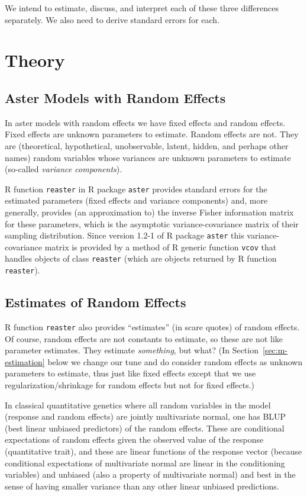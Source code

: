 \documentclass[11pt]{article}
\let\code=\texttt
\begin{document}
We intend to estimate, discuss, and interpret each of these three differences
separately.  We also need to derive standard errors for each.

\section{Theory}

\subsection{Aster Models with Random Effects}

In aster models with random effects \citep{reaster} we have fixed effects
and random effects.  Fixed effects are unknown parameters to estimate.
Random effects are not.  They are (theoretical, hypothetical, unobservable,
latent, hidden, and perhaps other names) random variables whose variances are
unknown parameters to estimate (so-called \emph{variance components}).

R function \code{reaster} in R package \code{aster} \citep{aster-package}
provides standard errors for the estimated parameters (fixed effects and
variance components) and, more generally, provides (an approximation to)
the inverse Fisher information matrix for these parameters, which is the
asymptotic variance-covariance matrix of their sampling distribution.
Since version 1.2-1 of R package \code{aster} this variance-covariance
matrix is provided by a method of R generic
function \code{vcov} that handles objects of class \code{reaster} (which
are objects returned by R function \code{reaster}).

\subsection{Estimates of Random Effects}
\label{sec:b-hat}

R function \code{reaster} also provides ``estimates'' (in scare quotes)
of random effects.  Of course, random effects are not constants to estimate,
so these are not like parameter estimates.  They estimate \emph{something}, but
what?  (In Section~\ref{sec:m-estimation} below we change our tune and do
consider random effects as unknown parameters to estimate, thus just like
fixed effects except that we use regularization/shrinkage for random
effects but not for fixed effects.)

In classical quantitative genetics where all random variables in the model
(response and random effects) are jointly multivariate normal, one has
BLUP (best linear unbiased predictors) of the random effects.  These
are conditional expectations of random effects given the observed value
of the response (quantitative trait), and these are linear functions
of the response vector (because conditional expectations of multivariate
normal are linear in the conditioning variables) and unbiased
(also a property of multivariate normal)
and best in the sense of having smaller variance than any other linear
unbiased predictions.
\end{document}
